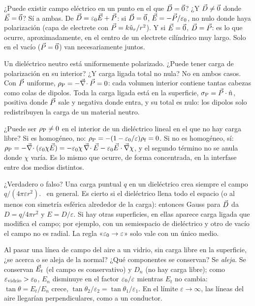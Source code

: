 \begin{pregunta}{¿Puede existir campo eléctrico en un punto en el que $\vec D=\vec 0$? ¿Y $\vec D\neq\vec 0$ donde $\vec E=\vec 0$?}
Sí a ambas. De $\vec D=\varepsilon_0\vec E+\vec P$: si $\vec D=\vec 0$, $\vec E=-\vec P/\varepsilon_0$, no nulo donde haya polarización (capa de electrete con $\vec P=k\hat u_{r}/r^2$). Y si
$\vec E=\vec 0$, $\vec D=\vec P$: es lo que ocurre, aproximadamente, en el centro de un electrete cilíndrico muy largo. Solo en el vacío ($\vec P=\vec 0$)
van necesariamente juntos.
\end{pregunta}

\begin{pregunta}{Un dieléctrico neutro está uniformemente polarizado. ¿Puede tener carga de polarización en su interior? ¿Y carga ligada total no nula?}
No en ambos casos. Con $\vec P$ uniforme, $\rho_{\mathrm P}=-\vec\nabla\!\cdot\vec P=0$: cada volumen interior contiene tantas cabezas como colas de dipolos. Toda la
carga ligada está en la superficie, $\sigma_{\mathrm P}=\vec P\cdot\hat n$, positiva donde $\vec P$ sale y negativa donde entra, y su total es nulo: los dipolos solo
redistribuyen la carga de un material neutro.
\end{pregunta}

\begin{pregunta}{¿Puede ser $\rho_{\mathrm P}\neq0$ en el interior de un dieléctrico lineal en el que no hay carga libre?}
Si es homogéneo, no: $\rho_{\mathrm P}=-(1-\varepsilon_0/\varepsilon)\rho_{\mathrm f}=0$. Si no es homogéneo, sí: $\rho_{\mathrm P}=-\vec\nabla\!\cdot(\varepsilon_0\chi\vec E)=-\varepsilon_0\chi\,\vec\nabla\!\cdot\vec E-\varepsilon_0\vec E\cdot\vec\nabla\chi$, y el
segundo término no se anula donde $\chi$ varía. Es lo mismo que ocurre, de forma concentrada, en la interfase entre dos medios distintos.
\end{pregunta}

\begin{pregunta}{¿Verdadero o falso? Una carga puntual $q$ en un dieléctrico \LHI{} crea siempre el campo $q/(4\pi\varepsilon r^2)$.}
\Fal\ en general. Es cierto si el dieléctrico llena todo el espacio (o al menos con simetría esférica alrededor de la carga): entonces
Gauss para $\vec D$ da $D=q/4\pi r^2$ y $E=D/\varepsilon$. Si hay otras superficies, en ellas aparece carga ligada que modifica el campo; por ejemplo,
con un semiespacio de dieléctrico y otro de vacío el campo no es radial. La regla «$\varepsilon_0\to\varepsilon$» solo vale con un único medio.
\end{pregunta}

\begin{pregunta}{Al pasar una línea de campo del aire a un vidrio, sin carga libre en la superficie, ¿se acerca o se aleja de la normal? ¿Qué componentes se conservan?}
Se \emph{aleja}. Se conservan $\vec E_t$ (el campo es conservativo) y $D_n$ (no hay carga libre); como $\varepsilon_{\text{vidrio}}>\varepsilon_0$,
$E_n$ disminuye en el factor $\varepsilon_0/\varepsilon$ mientras $E_t$ no cambia: $\tan\theta=E_t/E_n$ crece, $\tan\theta_2/\varepsilon_2=\tan\theta_1/\varepsilon_1$. En el límite
$\varepsilon\to\infty$, las líneas del aire llegarían perpendiculares, como a un conductor.
\end{pregunta}

